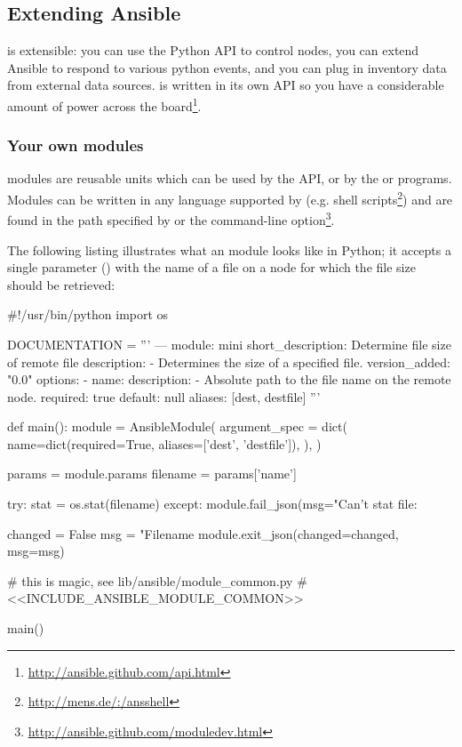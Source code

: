 \subsection*{Extending Ansible}

\ansible{} is extensible: you can use the \ansible{} Python API to control
nodes, you can extend Ansible to respond to various python events, and you can
plug in inventory data from external data sources. \ansible{} is written in its
own API so you have a considerable amount of power across the
board\footnote{\url{http://ansible.github.com/api.html}}.

\subsubsection*{Your own modules}

\ansible{} modules are reusable units which can be used by the \ansible{} API,
or by the  or  programs. Modules can be written
in any language supported by  (e.g. shell
scripts\footnote{\url{http://mens.de/:/ansshell}}) and are found in the path
specified by  or the  command-line
option\footnote{\url{http://ansible.github.com/moduledev.html}}.

The following listing illustrates what an \ansible{} module looks like in Python;
it accepts a single parameter () with the name of a file on a node for
which the file size should be retrieved:

\begin{extymeta}
#!/usr/bin/python
import os

DOCUMENTATION = '''
---
module: mini
short_description: Determine file size of remote file
description:
     - Determines the size of a specified file.
version_added: "0.0"
options:
  - name:
      description:
        - Absolute path to the file name on the remote node.
      required: true
      default: null
      aliases: [dest, destfile]
'''

def main():
    module = AnsibleModule(
        argument_spec = dict(
            name=dict(required=True, aliases=['dest', 'destfile']),
        ),
    )

    params = module.params
    filename = params['name']

    try:
        stat = os.stat(filename)
    except:
        module.fail_json(msg="Can't stat file: %

    changed = False
    msg = "Filename %
    module.exit_json(changed=changed, msg=msg)

# this is magic, see lib/ansible/module_common.py
#<<INCLUDE_ANSIBLE_MODULE_COMMON>>

main()
\end{extymeta}


